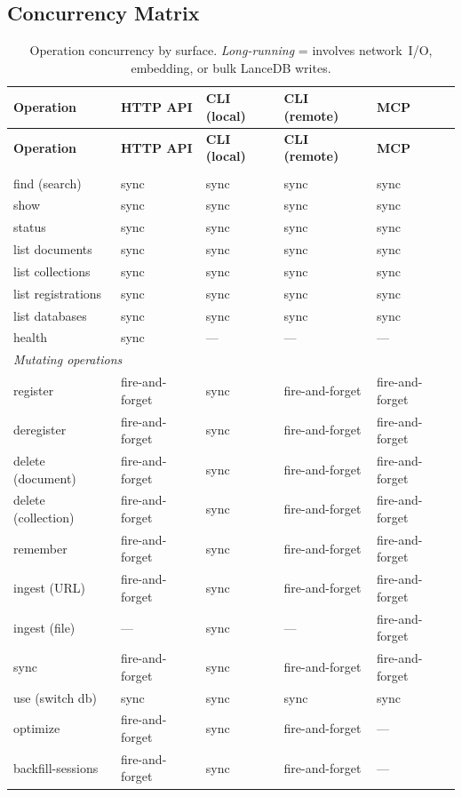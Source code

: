 \documentclass[a4paper,10pt]{article}
\begin{document}
\subsection{Concurrency Matrix}

\begin{longtable}{l l l l l}
\caption{Operation concurrency by surface.
  \emph{Long-running} = involves network~I/O, embedding, or bulk
  LanceDB writes.}\label{tab:concurrency} \\
\toprule
\textbf{Operation} & \textbf{HTTP API} & \textbf{CLI (local)}
  & \textbf{CLI (remote)} & \textbf{MCP} \\
\midrule
\endfirsthead
\toprule
\textbf{Operation} & \textbf{HTTP API} & \textbf{CLI (local)}
  & \textbf{CLI (remote)} & \textbf{MCP} \\
\midrule
\endhead
\bottomrule
\endfoot
%
\multicolumn{5}{l}{\emph{Read operations}} \\
\midrule
find (search)       & sync   & sync & sync & sync \\
show                & sync   & sync & sync & sync \\
status              & sync   & sync & sync & sync \\
list documents      & sync   & sync & sync & sync \\
list collections    & sync   & sync & sync & sync \\
list registrations  & sync   & sync & sync & sync \\
list databases      & sync   & sync & sync & sync \\
health              & sync   & ---  & ---  & ---  \\
\midrule
%
\multicolumn{5}{l}{\emph{Mutating operations}} \\
\midrule
register            & fire-and-forget & sync & fire-and-forget & fire-and-forget \\
deregister          & fire-and-forget & sync & fire-and-forget & fire-and-forget \\
delete (document)   & fire-and-forget & sync & fire-and-forget & fire-and-forget \\
delete (collection) & fire-and-forget & sync & fire-and-forget & fire-and-forget \\
remember            & fire-and-forget & sync & fire-and-forget & fire-and-forget \\
ingest (URL)        & fire-and-forget & sync & fire-and-forget
                    & fire-and-forget \\
ingest (file)       & ---    & sync & ---  & fire-and-forget \\
sync                & fire-and-forget & sync & fire-and-forget
                    & fire-and-forget \\
use (switch db)     & sync   & sync & sync & sync \\
optimize            & fire-and-forget & sync & fire-and-forget & --- \\
backfill-sessions   & fire-and-forget & sync & fire-and-forget & --- \\
\end{longtable}
\end{document}
